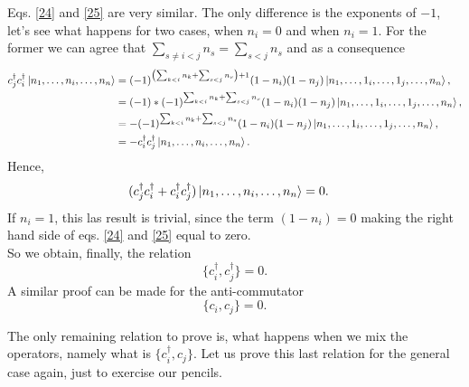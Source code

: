 Eqs. \ref{24} and \ref{25} are very similar. The only difference is the exponents of $-1$, let's see what happens for two cases, when $n_i = 0$ and when $n_i=1$. For the former we can agree that $\sum_{s\neq i<j}n_s = \sum_{s<j}n_s$ and as a consequence 
\begin{equation*}
    \begin{aligned}
        c_j^\dagger c_i^\dagger \ket{n_1,\ldots,n_i,\ldots,n_n} &=(-1)^{\left(\sum_{k<i}n_k + \sum_{s<j}n_s\right) + 1} (1-n_i) (1-n_j)\ket{n_1,\ldots,1_i,\ldots,1_j,\ldots,n_n},\\
        &=(-1)*(-1)^{\sum_{k<i}n_k + \sum_{s<j}n_s} (1-n_i) (1-n_j)\ket{n_1,\ldots,1_i,\ldots,1_j,\ldots,n_n},\\
        &=-(-1)^{\sum_{k<i}n_k + \sum_{s<j}n_s} (1-n_i) (1-n_j)\ket{n_1,\ldots,1_i,\ldots,1_j,\ldots,n_n},\\
        &= - c_i^\dagger c_j^\dagger \ket{n_1,\ldots,n_i,\ldots,n_n}.
    \end{aligned}
\end{equation*}
Hence, 
\begin{equation*}
    \begin{aligned}
        (c_j^\dagger c_i^\dagger + c_i^\dagger c_j^\dagger) \ket{n_1,\ldots,n_i,\ldots,n_n} &=0.
    \end{aligned}
\end{equation*}
If $n_i=1$, this las result is trivial, since the term $(1-n_i)=0$ making the right hand side  of eqs. \ref{24} and \ref{25} equal to zero.\\

So we obtain, finally, the relation 
\begin{equation}
  \{c_i^\dagger,c_j^\dagger\} = 0.
\end{equation}
A similar proof can be made for the anti-commutator
\begin{equation}
  \{c_i,c_j\} = 0.
\end{equation}

The only remaining relation to prove is, what happens when we mix the operators, namely what is $\{c_i^\dagger,c_j\}$. Let us prove this last relation for the general case again, just to exercise our pencils.\\


